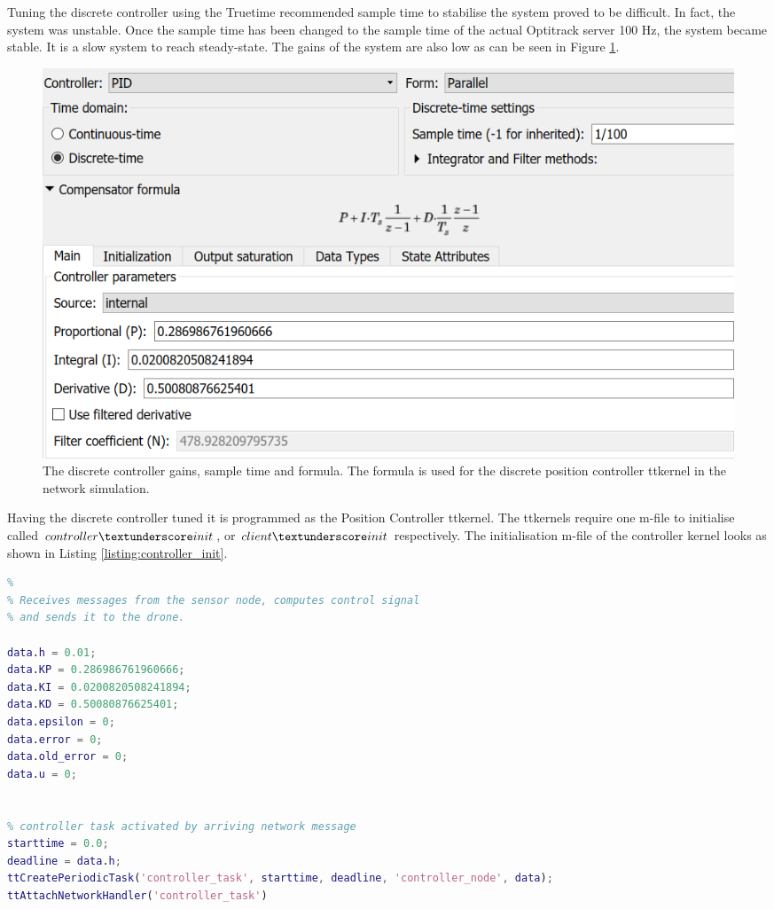 Tuning the discrete controller using the Truetime recommended sample time to stabilise the system proved to be difficult. In fact, the system was unstable. Once the sample time has been changed to the sample time of the actual Optitrack server 100 Hz, the system became stable. It is a slow system to reach steady-state. The gains of the system are also low as can be seen in Figure \ref{figure:tuning_discrete}.

\begin{figure}[H]
\centering
 \includegraphics[scale=0.6]{Figures/tuning_discrete.png}
 \caption{The discrete controller gains, sample time and formula. The formula is used for the discrete position controller ttkernel in the network simulation.}
 \label{figure:tuning_discrete}
\end{figure}

Having the discrete controller tuned it is programmed as the Position Controller ttkernel. The ttkernels require one m-file to initialise called $controller\textunderscore init$, or $client\textunderscore  init$ respectively. The initialisation m-file of the controller kernel looks as shown in Listing \ref{listing:controller_init}.

\begin{lstlisting}[language=Matlab, caption={controller\textunderscore init.m}, label={listing:controller_init}]
% Distributed control system: controller node
%
% Receives messages from the sensor node, computes control signal
% and sends it to the drone.

data.h = 0.01;
data.KP = 0.286986761960666;
data.KI = 0.0200820508241894;
data.KD = 0.50080876625401; 
data.epsilon = 0;
data.error = 0;
data.old_error = 0;
data.u = 0;


% controller task activated by arriving network message
starttime = 0.0;
deadline = data.h;
ttCreatePeriodicTask('controller_task', starttime, deadline, 'controller_node', data);
ttAttachNetworkHandler('controller_task')
\end{lstlisting}

